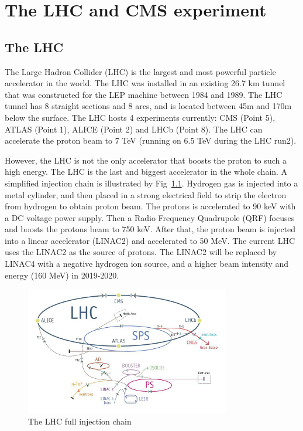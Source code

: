 \chapter{The LHC and CMS experiment}

\clearpage
\section{The LHC}

The Large Hadron Collider (LHC) is the largest and most powerful particle accelerator in the world. The LHC was installed in an existing 26.7 km tunnel that was constructed for the LEP machine between 1984 and 1989. The LHC tunnel has 8 straight sections and 8 arcs, and is located between 45m and 170m below the surface. The LHC hosts 4 experiments currently: CMS (Point 5), ATLAS (Point 1), ALICE (Point 2) and LHCb (Point 8). The LHC can accelerate the proton beam to 7 TeV (running on 6.5 TeV during the LHC run2).

However, the LHC is not the only accelerator that boosts the proton to such a high energy. The LHC is the last and biggest accelerator in the whole chain. A simplified injection chain is illustrated by Fig~\ref{fig:c3lhclpsspslhc}. Hydrogen gas is injected into a metal cylinder, and then placed in a strong electrical field to strip the electron from hydrogen to obtain proton beam. The protons is accelerated to 90 keV with a DC voltage power supply. Then a Radio Frequency Quadrupole (QRF) focuses and boosts the protons beam to 750 keV. After that, the proton beam is injected into a linear accelerator (LINAC2) and accelerated to 50 MeV. The current LHC uses the LINAC2 as the source of protons. The LINAC2 will be replaced by LINAC4 with a negative hydrogen ion source, and a higher beam intensity and energy (160 MeV) in 2019-2020. 

\begin{figure}[htbp]
 \begin{center}
  \includegraphics[width=0.8\textwidth]{figures/c3/c3_lhc_lpsspslhc.jpg}
 \end{center}
 \caption{The LHC full injection chain}
 \label{fig:c3lhclpsspslhc}
\end{figure}

